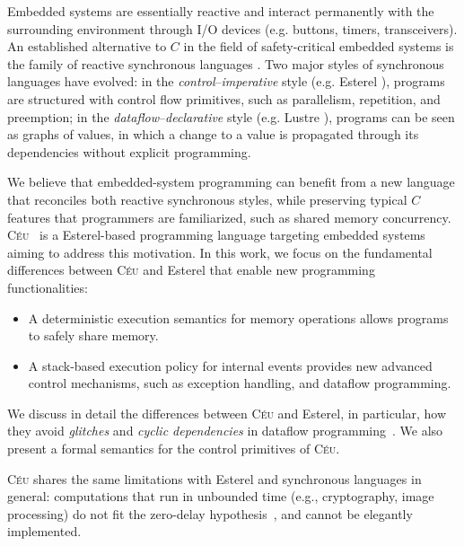 \documentclass{acm_proc_article-sp}
\newcommand{\CEU}{\textsc{C\'{e}u}\xspace}
\newcommand{\1}{\;}
\newcommand{\2}{\;\;}
\newcommand{\3}{\;\;\;}
\newcommand{\5}{\;\;\;\;\;}
\begin{document}
Embedded systems are essentially reactive and interact permanently with the 
surrounding environment through I/O devices (e.g. buttons, timers, 
transceivers).
%
An established alternative to $C$ in the field of safety-critical embedded 
systems is the family of reactive synchronous languages \cite{rp.twelve}.
Two major styles of synchronous languages have evolved:
in the \emph{control}--\emph{imperative} style (e.g. Esterel 
\cite{esterel.ieee91}), programs are structured with control flow primitives, 
such as parallelism, repetition, and preemption;
in the \emph{dataflow}--\emph{declarative} style (e.g. Lustre 
\cite{lustre.ieee91}), programs can be seen as graphs of values, in which a 
change to a value is propagated through its dependencies without explicit 
programming.

We believe that embedded-system programming can benefit from a new language 
that reconciles both reactive synchronous styles, while preserving typical $C$ 
features that programmers are familiarized, such as shared memory concurrency.
%
\CEU~\cite{ceu.sensys}
is a Esterel-based programming language targeting embedded systems aiming to 
address this motivation.
In this work, we focus on the fundamental differences between \CEU and Esterel 
that enable new programming functionalities:
%
\begin{itemize}
\item A deterministic execution semantics for memory operations allows programs 
to safely share memory.
%
\item A stack-based execution policy for internal events provides new advanced 
control mechanisms, such as exception handling, and dataflow programming.
\end{itemize}

We discuss in detail the differences between \CEU and Esterel, in particular, 
how they avoid \emph{glitches} and \emph{cyclic dependencies} in dataflow 
programming~\cite{frp.survey}.
We also present a formal semantics for the control primitives of \CEU.

\CEU shares the same limitations with Esterel and synchronous languages in 
general:
computations that run in unbounded time (e.g., cryptography, image processing) 
do not fit the zero-delay hypothesis~\cite{rp.hypothesis}, and cannot be 
elegantly implemented.
\end{document}
